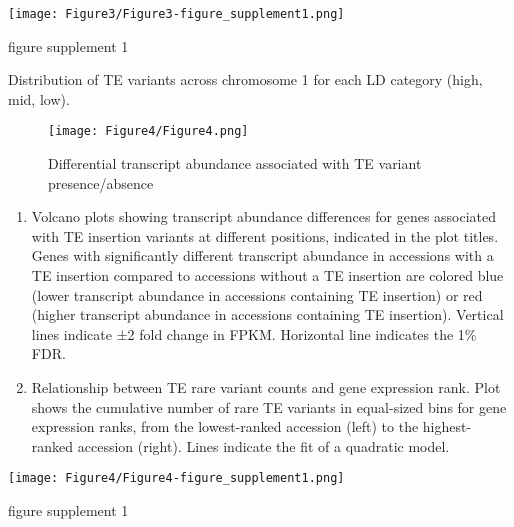 \documentclass[12pt]{article}
\begin{document}

\setcounter{suppfigure}{2}

\begin{suppfigure}
  \centering
  \texttt{[image: Figure3/Figure3-figure\_supplement1.png]}
  \caption{figure supplement 1}
  \label{fig3s1}
\end{suppfigure}

Distribution of TE variants across chromosome 1 for each LD category
(high, mid, low).

\pagebreak


\begin{figure}
  \centering
  \texttt{[image: Figure4/Figure4.png]}
  \caption{Differential transcript abundance associated with TE variant presence/absence}
  \label{fig4}
\end{figure}

\begin{enumerate}
  \def\labelenumi{(\Alph{enumi})}
\item
  Volcano plots showing transcript abundance differences for genes
  associated with TE insertion variants at different positions,
  indicated in the plot titles. Genes with significantly different
  transcript abundance in accessions with a TE insertion compared to
  accessions without a TE insertion are colored blue (lower transcript
  abundance in accessions containing TE insertion) or red (higher
  transcript abundance in accessions containing TE insertion). Vertical
  lines indicate ±2 fold change in FPKM. Horizontal line indicates the
  1\% FDR.
\item
  Relationship between TE rare variant counts and gene expression rank.
  Plot shows the cumulative number of rare TE variants in equal-sized
  bins for gene expression ranks, from the lowest-ranked accession
  (left) to the highest-ranked accession (right). Lines indicate the fit
  of a quadratic model.
\end{enumerate}

\pagebreak


\setcounter{suppfigure}{3}

\begin{suppfigure}
  \centering
  \texttt{[image: Figure4/Figure4-figure\_supplement1.png]}
  \caption{figure supplement 1}
  \label{fig4s1}
\end{suppfigure}
\end{document}
